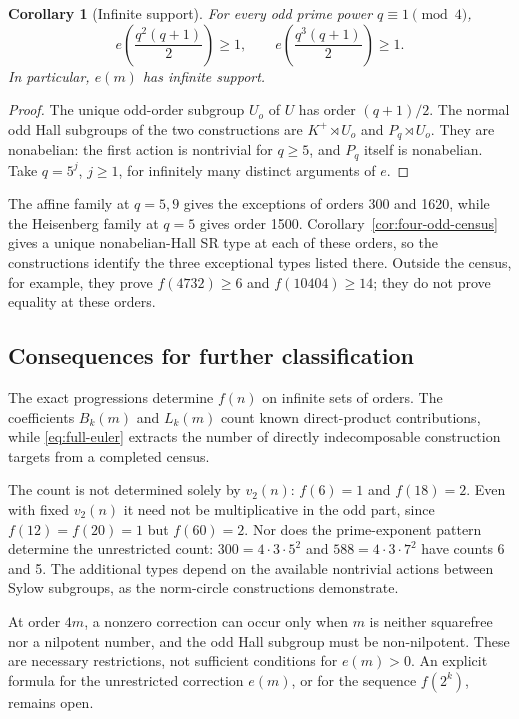 \documentclass[11pt,a4paper]{amsart}
\newtheorem{corl}[thm]{Corollary}
\theoremstyle{definition}
\theoremstyle{remark}
\numberwithin{equation}{section}
\begin{document}
\begin{corl}[Infinite support]\label{cor:infinite-correction-main}
For every odd prime power $q\equiv1\pmod4$,
\[
 e\!\left(\frac{q^2(q+1)}2\right)\ge1,
 \qquad e\!\left(\frac{q^3(q+1)}2\right)\ge1.
\]
In particular, $e(m)$ has infinite support.
\end{corl}
\begin{proof}
The unique odd-order subgroup $U_o$ of $U$ has order $(q+1)/2$.
The normal odd Hall subgroups of the two constructions are
$K^+\rtimes U_o$ and $P_q\rtimes U_o$. They are nonabelian:
the first action is nontrivial for $q\ge5$, and $P_q$ itself
is nonabelian. Take $q=5^j$, $j\ge1$, for infinitely many distinct
arguments of $e$.
\end{proof}

The affine family at $q=5,9$ gives the exceptions of orders 300
and 1620, while the Heisenberg family at $q=5$ gives order 1500.
Corollary~\ref{cor:four-odd-census} gives a unique nonabelian-Hall
SR type at each of these orders, so the constructions identify the
three exceptional types listed there. Outside the census,
for example, they prove $f(4732)\ge6$ and $f(10404)\ge14$;
they do not prove equality at these orders.

\subsection{Consequences for further classification}
The exact progressions determine $f(n)$ on infinite sets of orders.
The coefficients $B_k(m)$ and $L_k(m)$ count known direct-product
contributions, while \eqref{eq:full-euler} extracts the number of
directly indecomposable construction targets from a completed census.

The count is not determined solely by $v_2(n)$: $f(6)=1$ and
$f(18)=2$. Even with fixed $v_2(n)$ it need not be multiplicative in
the odd part, since $f(12)=f(20)=1$ but $f(60)=2$.
Nor does the prime-exponent pattern determine the unrestricted count:
$300=4\cdot3\cdot5^2$ and $588=4\cdot3\cdot7^2$ have counts
6 and 5. The additional types depend on the available nontrivial
actions between Sylow subgroups, as the norm-circle constructions
demonstrate.

At order
$4m$, a nonzero correction can occur only when $m$ is neither
squarefree nor a nilpotent number, and the odd Hall subgroup must be
non-nilpotent. These are necessary restrictions, not sufficient
conditions for $e(m)>0$.
An explicit formula for the unrestricted correction $e(m)$, or for
the sequence $f(2^k)$, remains open.
\end{document}

